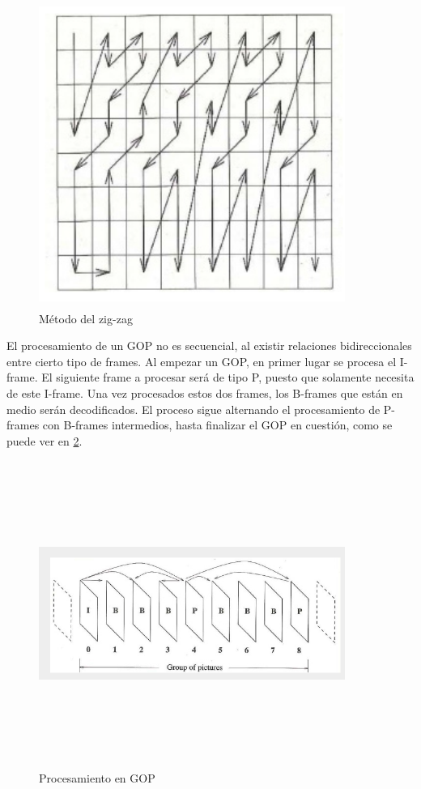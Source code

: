 \begin{figure}[ht!]
\begin{center}
\includegraphics[width=10cm,height=10cm,keepaspectratio]{figuras/zigzag.png}
\end{center}
\caption{Método del zig-zag\cite{b1:2015}}
\label{fig_zigzag}
\end{figure}

El procesamiento de un GOP no es secuencial, al existir relaciones bidireccionales entre cierto tipo de frames. Al empezar un GOP, en primer lugar se procesa el I-frame. El siguiente frame a procesar será de tipo P, puesto que solamente necesita de este I-frame. Una vez procesados estos dos frames, los B-frames que están en medio serán decodificados. El proceso sigue alternando el procesamiento de P-frames con B-frames intermedios, hasta finalizar el GOP en cuestión, como se puede ver en \ref{fig_gop}.

\begin{figure}[ht!]
\begin{center}
\includegraphics[width=10cm,height=10cm,keepaspectratio]{figuras/gop.png}
\end{center}
\caption{Procesamiento en GOP}
\label{fig_gop}
\end{figure}

